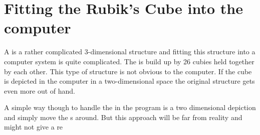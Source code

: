 \chapter{Fitting the Rubik's Cube into the computer}
A \rubik{} is a rather complicated 3-dimensional structure and fitting this structure into a computer system is quite complicated. The \rubik{} is build up by 26 cubies held together by each other. This type of structure is not obvious to the computer. If the cube is depicted in the computer in a two-dimensional space the original \rubik{} structure gets even more out of hand. 

A simple way though to handle the \rubik{} in the program is a two dimensional depiction and simply move the \facelet{}s around. But this approach will be far from reality and might not give a re
